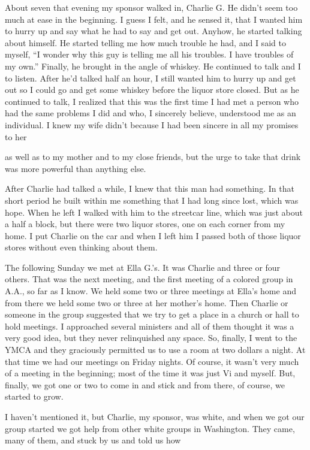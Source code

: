 About seven that evening my sponsor walked in, Charlie G. He didn’t seem too much at ease in the beginning. I guess I felt, and he sensed it, that I wanted him to hurry up and say what he had to say and get out. Anyhow, he started talking about himself. He started telling me how much trouble he had, and I said to myself, “I wonder why this guy is telling me all his troubles. I have troubles of my own.” Finally, he brought in the angle of whiskey. He continued to talk and I to listen. After he’d talked half an hour, I still wanted him to hurry up and get out so I could go and get some whiskey before the liquor store closed. But as he continued to talk, I realized that this was the first time I had met a person who had the same problems I did and who, I sincerely believe, understood me as an individual. I knew my wife didn’t because I had been sincere in all my promises to her

as well as to my mother and to my close friends, but the urge to take that drink was more powerful than anything else.

After Charlie had talked a while, I knew that this man had something. In that short period he built within me something that I had long since lost, which was hope. When he left I walked with him to the streetcar line, which was just about a half a block, but there were two liquor stores, one on each corner from my home. I put Charlie on the car and when I left him I passed both of those liquor stores without even thinking about them.

The following Sunday we met at Ella G.’s. It was Charlie and three or four others. That was the next meeting, and the first meeting of a colored group in A.A., so far as I know. We held some two or three meetings at Ella’s home and from there we held some two or three at her mother’s home. Then Charlie or someone in the group suggested that we try to get a place in a church or hall to hold meetings. I approached several ministers and all of them thought it was a very good idea, but they never relinquished any space. So, finally, I went to the YMCA and they graciously permitted us to use a room at two dollars a night. At that time we had our meetings on Friday nights. Of course, it wasn’t very much of a meeting in the beginning; most of the time it was just Vi and myself. But, finally, we got one or two to come in and stick and from there, of course, we started to grow.

I haven’t mentioned it, but Charlie, my sponsor, was white, and when we got our group started we got help from other white groups in Washington. They came, many of them, and stuck by us and told us how

